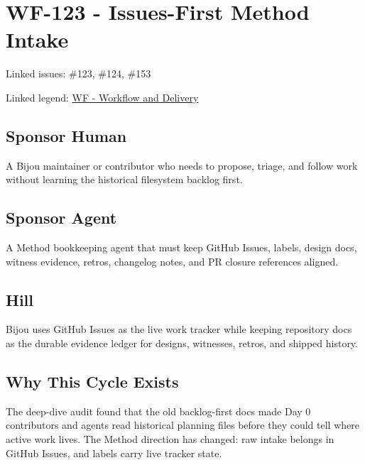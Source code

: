 \chapter{WF-123 - Issues-First Method Intake}\label{record-207}

\smallskip

Linked issues: \#123, \#124, \#153

Linked legend: \href{https://github.com/flyingrobots/bijou/blob/1853ad902f6bf219326409e7f743a5a1d6517dbc/docs/legends/WF-workflow-and-delivery.md}{WF - Workflow and Delivery}

\section{Sponsor Human}\label{record-207-sponsor-human}

A Bijou maintainer or contributor who needs to propose, triage, and follow work without learning the historical filesystem backlog first.

\section{Sponsor Agent}\label{record-207-sponsor-agent}

A Method bookkeeping agent that must keep GitHub Issues, labels, design docs, witness evidence, retros, changelog notes, and PR closure references aligned.

\section{Hill}\label{record-207-hill}

Bijou uses GitHub Issues as the live work tracker while keeping repository docs as the durable evidence ledger for designs, witnesses, retros, and shipped history.

\section{Why This Cycle Exists}\label{record-207-why-this-cycle-exists}

The deep-dive audit found that the old backlog-first docs made Day 0 contributors and agents read historical planning files before they could tell where active work lives. The Method direction has changed: raw intake belongs in GitHub Issues, and labels carry live tracker state.

